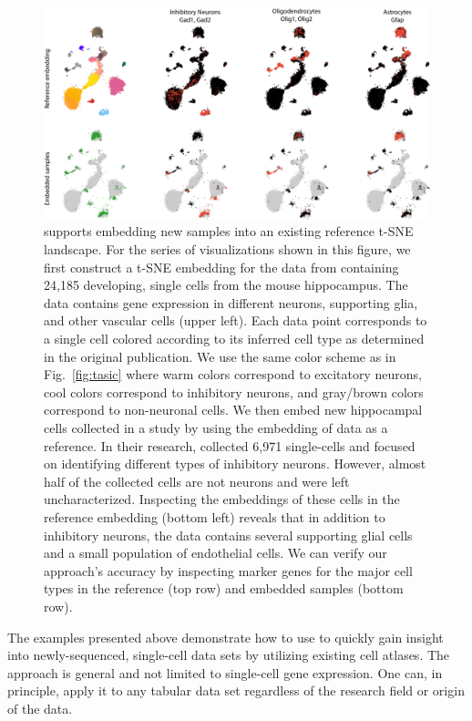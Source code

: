 \documentclass[article]{jss}
\newcommand{\opentsne}{\pkg{openTSNE}\xspace}
\begin{document}
\begin{figure}[htbp]
  \includegraphics[width=\textwidth]{transform_hochgerner}
  \caption{\label{fig:transform}
  \opentsne supports embedding new samples into an existing reference t-SNE landscape. For the series of visualizations shown in this figure, we first construct a t-SNE embedding for the data from \citet{hochgerner2018conserved} containing 24,185 developing, single cells from the mouse hippocampus. The data contains gene expression in different neurons, supporting glia, and other vascular cells (upper left). Each data point corresponds to a single cell colored according to its inferred cell type as determined in the original publication. We use the same color scheme as in Fig.~\ref{fig:tasic} where warm colors correspond to excitatory neurons, cool colors correspond to inhibitory neurons, and gray/brown colors correspond to non-neuronal cells. We then embed new hippocampal cells collected in a study by \citet{harris2018classes} using the embedding of \citet{hochgerner2018conserved} data as a reference. In their research, \citet{harris2018classes} collected 6,971 single-cells and focused on identifying different types of inhibitory neurons. However, almost half of the collected cells are not neurons and were left uncharacterized. Inspecting the embeddings of these cells in the reference embedding (bottom left) reveals that in addition to inhibitory neurons, the data contains several supporting glial cells and a small population of endothelial cells. We can verify our approach's accuracy by inspecting marker genes for the major cell types in the reference (top row) and embedded samples (bottom row).}
\end{figure}

The examples presented above demonstrate how to use \opentsne to quickly gain insight into newly-sequenced, single-cell data sets by utilizing existing cell atlases. The approach is general and not limited to single-cell gene expression. One can, in principle, apply it to any tabular data set regardless of the research field or origin of the data.
\end{document}
